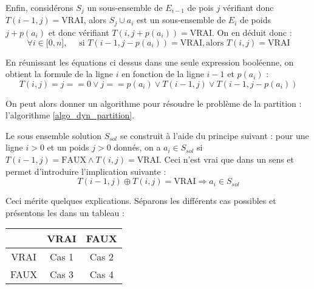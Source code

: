 Enfin, considérons $S_j$ un sous-ensemble de $E_{i-1}$ de pois $j$ vérifiant donc $T(i-1, j) =
\mbox{VRAI}$, alors $S_j \cup a_i$ est un sous-ensemble de $E_i$ de poids $j+p(a_i)$ et donc
vérifiant $T(i,j+p(a_i)) = \mbox{VRAI}$. On en déduit donc :
\begin{equation}
	\forall i \in \mathbb{[}0, n \mathbb{]}, \quad \mbox{ si } T(i-1, j-p(a_i)) = \mbox{VRAI}, \mbox{
	alors } T(i,j) = \mbox{VRAI}
\end{equation}

En réunissant les équations ci dessus dans une seule expression booléenne, on obtient la formule de
la ligne $i$ en fonction de la ligne $i-1$ et $p(a_i)$ :
\begin{equation}
	T(i,j) = j == 0 \vee j == p(a_i) \vee T(i-1, j) \vee T(i-1, j-p(a_i))
\end{equation}

On peut alors donner un algorithme pour résoudre le problème de la partition : l'algorithme
\ref{algo_dyn_partition}.



Le sous ensemble solution $S_{sol}$ se construit à l'aide du principe suivant : pour une ligne $i>0$ et
un poids $j>0$ donnés, on a $a_i \in S_{sol}$ si $T(i-1, j) = \mbox{FAUX} \wedge T(i,j) =
\mbox{VRAI}$. Ceci n'est vrai que dans un sens et permet d'introduire l'implication suivante :
\begin{equation}
	\label{ineq}
	T(i-1, j) \oplus T(i, j) = \mbox{VRAI} \Rightarrow a_i \in S_{sol} 
\end{equation}

Ceci mérite quelques explications. Séparons les différents cas possibles et présentons les dans un
tableau : \\
\begin{center}
\begin{tabular}{|c|c|c|} \hline
	\backslashbox{$T(i-1, j)$}{$T(i,j)$} & VRAI & FAUX \\	\hline
	VRAI & Cas 1 & Cas 2 \\ \hline
	FAUX & Cas 3 & Cas 4 \\ \hline
\end{tabular}
\end{center}

